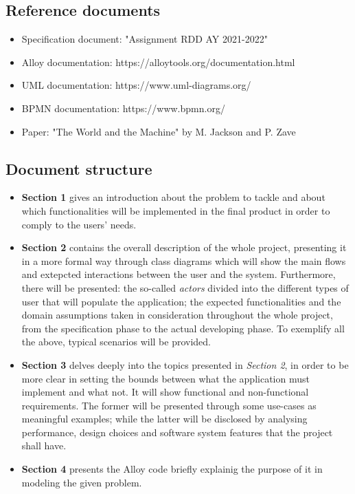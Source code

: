 \documentclass[table, 12pt]{article}
\begin{document}
\subsection{Reference documents}
\begin{itemize}
    \item Specification document: "Assignment RDD AY 2021-2022"
    \item Alloy documentation: https://alloytools.org/documentation.html
    \item UML documentation: https://www.uml-diagrams.org/
    \item BPMN documentation: https://www.bpmn.org/
    \item Paper: "The World and the Machine" by M. Jackson and P. Zave   
\end{itemize}

\subsection{Document structure}
\begin{itemize}
    \item \textbf{Section 1} gives an introduction about the problem to tackle and about which functionalities will be implemented in the final product in order to comply to the users' needs.
    \item \textbf{Section 2} contains the overall description of the whole project, presenting it in a more formal way through class diagrams which will show the main flows and extepcted interactions between the user and the system. Furthermore, there will be presented: the so-called \emph{actors} divided into the different types of user that will populate the application; the expected functionalities and the domain assumptions taken in consideration throughout the whole project, from the specification phase to the actual developing phase. To exemplify all the above, typical scenarios will be provided.
    \item \textbf{Section 3} delves deeply into the topics presented in \emph{Section 2}, in order to be more clear in setting the bounds between what the application must implement and what not. It will show functional and non-functional requirements. The former will be presented through some use-cases as meaningful examples; while the latter will be disclosed by analysing performance, design choices and software system features that the project shall have.
    \item \textbf{Section 4} presents the Alloy code briefly explainig the purpose of it in modeling the given problem.
\end{itemize}
\newpage
\end{document}
